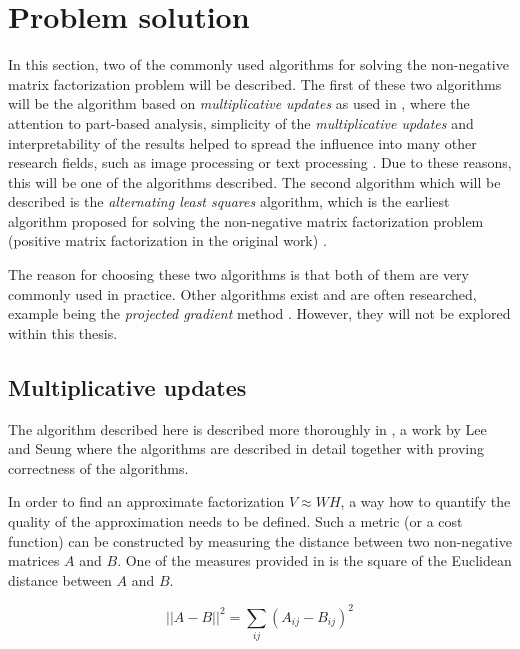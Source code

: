 \documentclass[thesis=M,english]{FITthesis}[2012/10/20]
\begin{document}
\section{Problem solution}
In this section, two of the commonly used algorithms for solving the
non-negative matrix factorization problem will be described. The
first of these two algorithms will be the algorithm based on
\emph{multiplicative updates} as used in \cite{lee99}, where the
attention to part-based analysis, simplicity of the \emph{multiplicative
updates} and interpretability of the results helped to spread the influence
into many other research fields, such as image processing or text
processing \cite{nmf-phd-thesis}. Due to these reasons, this will be one of the algorithms
described. The second algorithm which will be described is the \emph{alternating
least squares} algorithm, which is the earliest algorithm proposed for solving
the non-negative matrix factorization problem (positive matrix factorization
in the original work) \cite{nmf-paatero}.

The reason for choosing these two algorithms is that both of them are very
commonly used in practice. Other algorithms exist and are often researched,
example being the \emph{projected gradient} method \cite{projected-gradient}.
However, they will not be explored within this thesis.

\subsection{Multiplicative updates}
The algorithm described here is described more thoroughly in \cite{lee-algos},
a work by Lee and Seung where the algorithms are described in detail together
with proving correctness of the algorithms.

In order to find an approximate factorization $V \approx WH$, a way how to
quantify the quality of the approximation needs to be defined. Such a metric
(or a cost function) can be constructed by measuring the distance between
two non-negative matrices $A$ and $B$. One of the measures provided in
\cite{lee-algos} is the square of the Euclidean distance between $A$ and $B$.

\begin{equation}
||A - B||^2 = \sum_{ij}(A_{ij} - B_{ij})^2
\end{equation}
\end{document}
